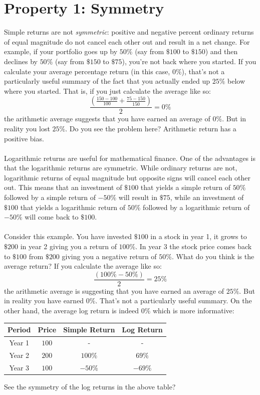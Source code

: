 \documentclass[11pt, oneside]{article}   	%
\begin{document}
\section{Property 1:  Symmetry}
Simple returns are not \emph{symmetric}: positive and negative percent ordinary returns of equal magnitude do not cancel each other out and result in a net change. For example, if your portfolio goes up by $50\%$ (say from $\$100$ to $\$150$) and then declines by $50\%$ (say from $\$150$ to $\$75$), you're not back where you started. If you calculate your average percentage return (in this case, $0\%$), that's not a particularly useful summary of the fact that you actually ended up $25\%$ below where you started. That is, if you just calculate the average like so:
\begin{equation}
	\frac{(\frac{150-100}{100} + \frac{75-150}{150})}{2} = 0\%
\end{equation}
the arithmetic average suggests that you have earned an average of $0\%$. But in reality you lost $25\%$. Do you see the problem here? Arithmetic return has a positive bias. 
\\
\\
Logarithmic returns are useful for mathematical finance. One of the advantages is that the logarithmic returns are symmetric. While ordinary returns are not, logarithmic returns of equal magnitude but opposite signs will cancel each other out. This means that an investment of $\$100$ that yields a simple return of $50\%$ followed by a simple return of $-50\%$ will result in $\$75$, while an investment of $\$100$ that yields a logarithmic return of $50\%$ followed by a logarithmic return of $-50\%$ will come back to $\$100$. 
\\
\\
Consider this example. You have invested $\$100$ in a stock in year 1, it grows to  $\$200$ in year 2 giving you a return of $100\%$. In year 3 the stock price comes back to $\$100$ from  $\$200$ giving you a negative return of $50\%$. What do you think is the average return? If you calculate the average like so:
\begin{equation}
	\frac{(100\% - 50\%)}{2} = 25\%
\end{equation}
the arithmetic average is suggesting that you have earned an average of $25\%$. But in reality you have earned $0\%$. That's not a particularly useful summary. On the other hand, the average log return is indeed $0\%$ which is more informative:
\begin{center}
  \begin{tabular}{ | c | c | c | c | }
    \hline
    Period & Price & Simple Return & Log Return \\ \hline
    Year 1 & $100$ & - & - \\ \hline
    Year 2 & $200$ & $100\%$ & $69\%$ \\ \hline
    Year 3 & $100$ & $-50\%$ & $-69\%$ \\
    \hline
  \end{tabular}
\end{center}
See the symmetry of the log returns in the above table?
\end{document}
